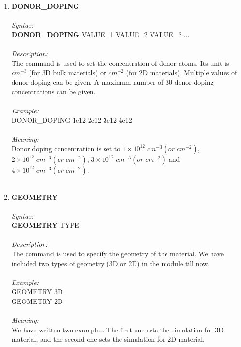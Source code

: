 \documentclass[12pt]{article}
\begin{document}
\begin{enumerate}
    \item \textbf{DONOR\_DOPING} \\ \\
    \textit{Syntax:} \\
    \textbf{DONOR\_DOPING} VALUE\_1 VALUE\_2 VALUE\_3 ... \\ \\ 
    \textit{Description:} \\
    The command is used to set the concentration of donor atoms. Its unit is $cm^{-3}$ (for 3D bulk materials) or $cm^{-2}$ (for 2D materials). Multiple values of donor doping can be given. A maximum number of 30 donor doping concentrations can be given. \\ \\  
    \textit{Example:} \\
    DONOR\_DOPING 1e12 2e12 3e12 4e12 \\ \\
    \textit{Meaning:} \\  
    Donor doping concentration is set to $1 \times 10^{12} \; cm^{-3} (or \; cm^{-2})$, $2 \times 10^{12} \; cm^{-3} (or \; cm^{-2})$, $3 \times 10^{12} \; cm^{-3} (or \; cm^{-2})$ and $4 \times 10^{12} \; cm^{-3} (or \; cm^{-2})$. \\ \\

    

    \item \textbf{GEOMETRY}   \\ \\
    \textit{Syntax:} \\
    \textbf{GEOMETRY} TYPE \\ \\
    \textit{Description:} \\
    The command is used to specify the geometry of the material. We have included two types of geometry (3D or 2D) in the module till now. \\ \\
    \textit{Example:} \\
    GEOMETRY 3D \\
    GEOMETRY 2D \\ \\
    \textit{Meaning:} \\   
    We have written two examples. The first one sets the simulation for 3D material, and the second one sets the simulation for 2D material. \\ \\


\end{enumerate}
\end{document}
